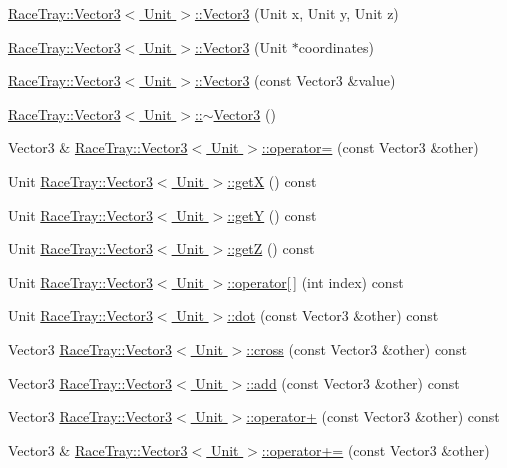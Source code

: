 \begin{DoxyCompactItemize}
\item 
\hyperlink{group___math_gaaa5ebab83f6d1f282df85ece8153311d}{Race\-Tray\-::\-Vector3$<$ Unit $>$\-::\-Vector3} (Unit x, Unit y, Unit z)
\item 
\hyperlink{group___math_ga1467854ce0d4ef24f84fecf84446910b}{Race\-Tray\-::\-Vector3$<$ Unit $>$\-::\-Vector3} (Unit $\ast$coordinates)
\item 
\hyperlink{group___math_ga636420f8171f95d953e80b9752ca98e8}{Race\-Tray\-::\-Vector3$<$ Unit $>$\-::\-Vector3} (const Vector3 \&value)
\item 
\hyperlink{group___math_ga5545e13e2e2861ece8f14b12a6a8101f}{Race\-Tray\-::\-Vector3$<$ Unit $>$\-::$\sim$\-Vector3} ()
\item 
Vector3 \& \hyperlink{group___math_gadcef1abbe010682b06779beab2fddc9e}{Race\-Tray\-::\-Vector3$<$ Unit $>$\-::operator=} (const Vector3 \&other)
\item 
Unit \hyperlink{group___math_gad352703f15280f9a3e92ab30f8f0a559}{Race\-Tray\-::\-Vector3$<$ Unit $>$\-::get\-X} () const 
\item 
Unit \hyperlink{group___math_ga958d217bc40bbecc3f7710f7d21d69e2}{Race\-Tray\-::\-Vector3$<$ Unit $>$\-::get\-Y} () const 
\item 
Unit \hyperlink{group___math_ga78a16de98839cff6799b841cd5dce3a5}{Race\-Tray\-::\-Vector3$<$ Unit $>$\-::get\-Z} () const 
\item 
Unit \hyperlink{group___math_gac176f26759f013157ae339e037abcbbd}{Race\-Tray\-::\-Vector3$<$ Unit $>$\-::operator\mbox{[}$\,$\mbox{]}} (int index) const 
\item 
Unit \hyperlink{group___math_ga6a55bfca19953a2b43b30796e4ce3f67}{Race\-Tray\-::\-Vector3$<$ Unit $>$\-::dot} (const Vector3 \&other) const 
\item 
Vector3 \hyperlink{group___math_ga3bad6b5bd57c5e674c6cb47e6eb75246}{Race\-Tray\-::\-Vector3$<$ Unit $>$\-::cross} (const Vector3 \&other) const 
\item 
Vector3 \hyperlink{group___math_gaf130562c28e9acf79a1947eae9bc583b}{Race\-Tray\-::\-Vector3$<$ Unit $>$\-::add} (const Vector3 \&other) const 
\item 
Vector3 \hyperlink{group___math_ga66fc04cc87dd36820cc8cad9d3ba7fae}{Race\-Tray\-::\-Vector3$<$ Unit $>$\-::operator+} (const Vector3 \&other) const 
\item 
Vector3 \& \hyperlink{group___math_ga5ccb50254f27230d20aab11372215fbc}{Race\-Tray\-::\-Vector3$<$ Unit $>$\-::operator+=} (const Vector3 \&other)
\item 

\end{DoxyCompactItemize}
